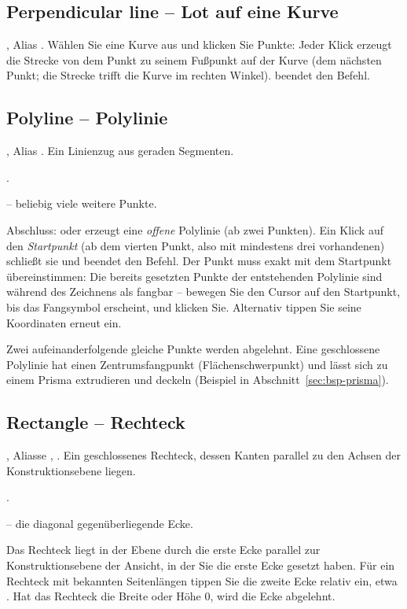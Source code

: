 \subsection{Perpendicular line -- Lot auf eine Kurve}\label{sec:cmd-perpendicular}
, Alias . Wählen Sie eine Kurve aus und klicken Sie Punkte: Jeder
Klick erzeugt die Strecke von dem Punkt zu seinem Fußpunkt auf der Kurve (dem nächsten Punkt;
die Strecke trifft die Kurve im rechten Winkel).  beendet den Befehl.

\subsection{Polyline -- Polylinie}\label{sec:cmd-polyline}
, Alias . Ein Linienzug aus geraden Segmenten.
\begin{schritte}
\item {}.
\item {} -- beliebig
  viele weitere Punkte.
\item Abschluss:  oder  erzeugt eine \emph{offene} Polylinie (ab
  zwei Punkten). Ein Klick auf den \emph{Startpunkt} (ab dem vierten Punkt, also mit mindestens
  drei vorhandenen) schließt sie und beendet den Befehl. Der Punkt muss exakt mit dem
  Startpunkt übereinstimmen: Die bereits gesetzten Punkte der entstehenden Polylinie sind
  während des Zeichnens als  fangbar -- bewegen Sie den Cursor auf den Startpunkt, bis
  das Fangsymbol erscheint, und klicken Sie. Alternativ tippen Sie seine Koordinaten erneut
  ein.
\end{schritte}
Zwei aufeinanderfolgende gleiche Punkte werden abgelehnt. Eine geschlossene Polylinie hat einen
Zentrumsfangpunkt (Flächenschwerpunkt) und lässt sich zu einem Prisma extrudieren und deckeln
(Beispiel in Abschnitt~\ref{sec:bsp-prisma}).

\subsection{Rectangle -- Rechteck}\label{sec:cmd-rectangle}
, Aliasse , . Ein geschlossenes Rechteck, dessen Kanten
parallel zu den Achsen der Konstruktionsebene liegen.
\begin{schritte}
\item {}.
\item {} -- die diagonal gegenüberliegende Ecke.
\end{schritte}
Das Rechteck liegt in der Ebene durch die erste Ecke parallel zur Konstruktionsebene der Ansicht,
in der Sie die erste Ecke gesetzt haben. Für ein Rechteck mit bekannten Seitenlängen tippen Sie
die zweite Ecke relativ ein, etwa . Hat das Rechteck die Breite oder Höhe 0, wird
die Ecke abgelehnt.

